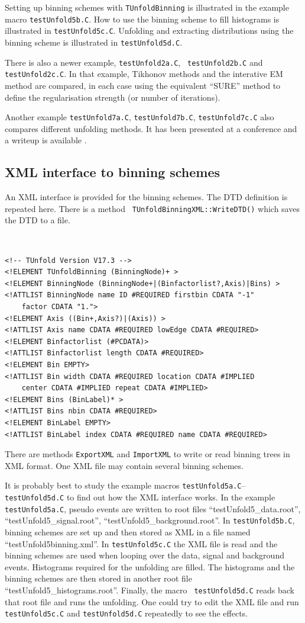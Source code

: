 \documentclass[12pt]{article}
\begin{document}
Setting up binning schemes with {\tt TUnfoldBinning} is illustrated in
the example macro {\tt testUnfold5b.C}. How to use the binning scheme to fill
histograms is illustrated in {\tt testUnfold5c.C}.
Unfolding and extracting distributions using the binning scheme is
illustrated in {\tt testUnfold5d.C}.

There is also a newer example, {\tt testUnfold2a.C}, {\tt
  testUnfold2b.C} and {\tt testUnfold2c.C}. In that example, Tikhonov
methods and the interative EM  method are compared, in each case using
the equivalent ``SURE'' method to define the regularisation strength
(or number of iterations).

Another example {\tt testUnfold7a.C}, {\tt testUnfold7b.C}, {\tt testUnfold7c.C}
also compares different unfolding methods. It has been presented at
a conference and a writeup is available \cite{conf12writeup}.

\subsection{XML interface to binning schemes}

An XML interface is provided for the binning schemes. The DTD
definition is repeated here. There is a method {\tt
  TUnfoldBinningXML::WriteDTD()} which saves the DTD to a file.
{\tt
\begin{verbatim}
<!-- TUnfold Version V17.3 -->
<!ELEMENT TUnfoldBinning (BinningNode)+ >
<!ELEMENT BinningNode (BinningNode+|(Binfactorlist?,Axis)|Bins) >
<!ATTLIST BinningNode name ID #REQUIRED firstbin CDATA "-1"
    factor CDATA "1.">
<!ELEMENT Axis ((Bin+,Axis?)|(Axis)) >
<!ATTLIST Axis name CDATA #REQUIRED lowEdge CDATA #REQUIRED>
<!ELEMENT Binfactorlist (#PCDATA)>
<!ATTLIST Binfactorlist length CDATA #REQUIRED>
<!ELEMENT Bin EMPTY>
<!ATTLIST Bin width CDATA #REQUIRED location CDATA #IMPLIED
    center CDATA #IMPLIED repeat CDATA #IMPLIED>
<!ELEMENT Bins (BinLabel)* >
<!ATTLIST Bins nbin CDATA #REQUIRED>
<!ELEMENT BinLabel EMPTY>
<!ATTLIST BinLabel index CDATA #REQUIRED name CDATA #REQUIRED>
\end{verbatim}
}
There are methods {\tt ExportXML} and {\tt ImportXML} to
write or read binning trees in XML format. One XML file may contain
several binning schemes. 

It is probably best to study the example macros {\tt testUnfold5a.C}--{\tt testUnfold5d.C} to find out how the XML interface works. In 
the example {\tt testUnfold5a.C}, pseudo events are written to root
files ``testUnfold5\_data.root'', ``testUnfold5\_signal.root'', ``testUnfold5\_background.root''. In {\tt testUnfold5b.C}, binning schemes are set up and then
stored as XML in a file named ``testUnfold5binning.xml''.
In {\tt testUnfold5c.C} the XML file is read and the binning schemes
are used when looping over the data, signal and background
events. Histograms required for the unfolding are filled. 
The histograms and the binning schemes are then stored in another root
file ``testUnfold5\_histograms.root''. Finally, the macro {\tt
  testUnfold5d.C} reads back that root file and runs the
unfolding. One could try to edit the XML file and run {\tt
  testUnfold5c.C} and {\tt testUnfold5d.C} repeatedly to see the
effects.
\end{document}
